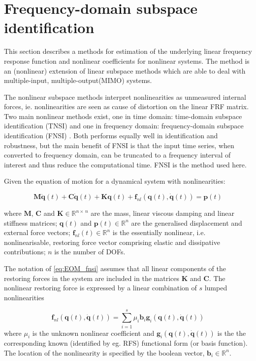 \section{Frequency-domain subspace identification}
\label{sec:freq-doma-subsp}

This section describes a methods for estimation of the underlying linear
frequency response function and nonlinear coefficients for nonlinear systems.
The method is an (nonlinear) extension of linear subspace methods which are able
to deal with multiple-input, multiple-output(MIMO) systems.

The nonlinear subspace methods interpret nonlinearities as unmeasured internal
forces, ie. nonlinearities are seen as cause of distortion on the linear FRF
matrix. Two main nonlinear methods exist, one in time domain: time-domain
subspace identification (TNSI)\autocite{marchesiello2008a} and one in frequency
domain: frequency-domain subspace identification (FNSI)\autocite{noel2013a} .
Both performs equally well in identification and robustness, but the main
benefit of FNSI is that the input time series, when converted to frequency
domain, can be truncated to a frequency interval of interest and thus reduce the
computational time. FNSI is the method used here.



Given the equation of motion for a dynamical system with nonlinearities:

\begin{equation}
  \label{eq:EOM_fnsi}
  \bm M \ddot{\bm q}(t) + \bm C \dot{\bm q}(t) + \bm K \bm q(t) +
  \bm f_{nl} \left( \bm q(t), \dot{ \bm q}(t) \right) = \bm p (t)
\end{equation}

where $\bm M$, $\bm C$ and $\bm K \in \mathbb{R}^{n \times \, n}$ are the
mass, linear viscous damping and linear stiffness matrices; $\bm q(t)$ and
$\bm p(t) \in \mathbb{R}^{n}$ are the generalised displacement and external
force vectors; $\bm f_{nl}(t) \in \mathbb{R}^{n}$ is the essentially nonlinear,
i.e. nonlinearisable, restoring force vector comprising elastic and dissipative
contributions; $n$ is the number of DOFs.


The notation of \eqref{eq:EOM_fnsi} assumes that all linear components of the
restoring forces in the system are included in the matrices $\bm K$ and $\bm
C$. The nonlinear restoring force is expressed by a linear combination of $s$
lumped nonlinearities

\begin{equation}
  \label{eq:nonlin_fnsi_lummped}
  \bm f_{nl} \left( \bm q(t), \dot{\bm q}(t) \right) =
  \sum_{i=1}^s \mu_i \bm b_i \bm g_i \left( \bm q(t), \dot{\bm q}(t) \right)
\end{equation}
where $\mu_i$ is the unknown nonlinear coefficient and $\bm g_i \left( \bm q(t),
  \dot{\bm q}(t) \right)$ is the the corresponding known (identified by eg. RFS)
functional form (or basis function). The location of the nonlinearity is
specified by the boolean vector, $\bm b_i \in \mathbb{R}^{n}$.



